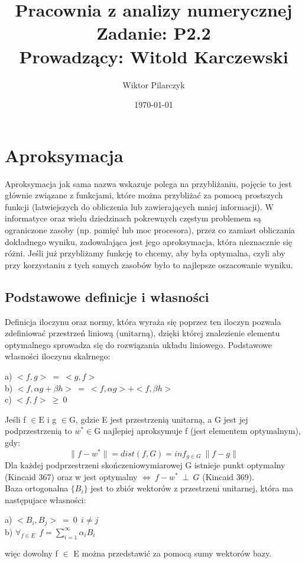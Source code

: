 \documentclass{article}
\author{Wiktor Pilarczyk}
\title{Pracownia z analizy numerycznej\\\small{Zadanie: P2.2}\\\large{Prowadzący: Witold Karczewski}}
\date{\today}
\begin{document}
\maketitle
\section{Aproksymacja}
Aproksymacja jak sama nazwa wskazuje polega na przybliżaniu, pojęcie to jest głównie związane z funkcjami, które można przybliżać za pomocą prostszych funkcji (latwiejszych do obliczenia lub zawierających mniej informacji). W informatyce oraz wielu dziedzinach pokrewnych częstym problemem są ograniczone zasoby (np. pamięć lub moc procesora), przez co zamiast obliczania dokładnego wyniku, zadowalająca jest jego aproksymacja, która nieznacznie się różni. Jeśli już przybliżamy funkcję to chcemy, aby była optymalna, czyli aby przy korzystaniu z tych samych zasobów było to najlepsze oszacowanie wyniku.

\subsection{Podstawowe definicje i własności}
Definicja iloczynu oraz normy, która wyraża się poprzez ten iloczyn pozwala zdefiniować przestrzeń liniową (unitarną), dzięki której znalezienie elementu optymalnego sprowadza się do rozwiązania układu liniowego.
Podstawowe własności iloczynu skalrnego:
\begin{tabbing}
\quad a)  $< f,g > \ = \ <g,f>$\\
\quad b)  $<f, \alpha g + \beta h> \ = \ <f, \alpha g> + <f, \beta h>$\\
\quad c)  $<f,f> \ \geq \ 0$  
\end{tabbing}
Jeśli f $\in \mathrm{E}$ i g $\in \mathrm{G}$, gdzie E jest przestrzenią unitarną, a G jest jej podprzestrzenią to $w^{*} \in \mathrm{G}$ najlepiej aproksymuje f (jest elementem optymalnym), gdy: 
\begin{equation} 
    \| f - w^{*} \| = dist(f,G) = inf_{g \in G} \ \| f - g \|
\end{equation}
Dla każdej podprzestrzeni skończeniowymiarowej G istnieje punkt optymalny (Kincaid 367) oraz w jest optymalny $\Leftrightarrow \ f - w^{*} \  \perp \  G $ (Kincaid 369).\\
Baza ortogonalna $ \{ B_{i} \}$ jest to zbiór wektorów z przestrzeni unitarnej, która ma następujace własności:
\begin{tabbing}

\quad a)  $< B_{i},B_{j} > \ = \ 0 \  \ i \neq j $\\
\quad b)  $ \forall_{f \in E} \ \ f = \sum_{i=1}^{\infty} \alpha_{i} B_{i}$
\end{tabbing}
więc dowolny f $\in$ E można przedstawić za pomocą sumy wektorów bazy.
\newpage
\end{document}
